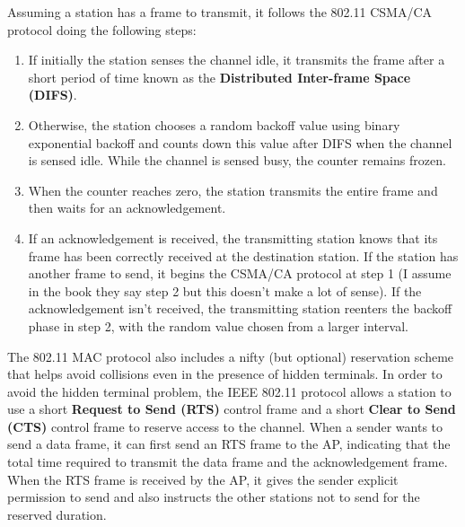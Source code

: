 Assuming a station has a frame to transmit, it follows the 802.11 CSMA/CA protocol doing the following steps:
\begin{enumerate}
\item If initially the station senses the channel idle, it transmits the frame after a short period of time known as the \textbf{Distributed Inter-frame Space (DIFS)}.
\item Otherwise, the station chooses a random backoff value using binary exponential backoff and counts down this value after DIFS when the channel is sensed idle. While the channel is sensed busy, the counter remains frozen.
\item When the counter reaches zero, the station transmits the entire frame and then waits for an acknowledgement.
\item If an acknowledgement is received, the transmitting station knows that its frame has been correctly received at the destination station. If the station has another frame to send, it begins the CSMA/CA protocol at step 1 (I assume in the book they say step 2 but this doesn't make a lot of sense). If the acknowledgement isn't received, the transmitting station reenters the backoff phase in step 2, with the random value chosen from a larger interval.
\end{enumerate}
The 802.11 MAC protocol also includes a nifty (but optional) reservation scheme that helps avoid collisions even in the presence of hidden terminals. In order to avoid the hidden terminal problem, the IEEE 802.11 protocol allows a station to use a short \textbf{Request to Send (RTS)} control frame and a short \textbf{Clear to Send (CTS)} control frame to reserve access to the channel. When a sender wants to send a data frame, it can first send an RTS frame to the AP, indicating that the total time required to transmit the data frame and the acknowledgement frame. When the RTS frame is received by the AP, it gives the sender explicit permission to send and also instructs the other stations not to send for the reserved duration.

